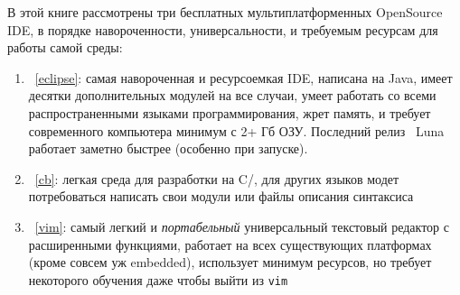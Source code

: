 В этой книге рассмотрены три бесплатных мультиплатформенных OpenSource IDE, в
порядке навороченности, универсальности, и требуемым ресурсам для работы самой
среды:

\begin{enumerate}
  \item \prog{\eclipse}\ \ref{eclipse}: самая навороченная и ресурсоемкая IDE,
  написана на Java, имеет десятки дополнительных модулей на все случаи, умеет работать со
  всеми распространенными языками программирования, жрет память, и требует
  современного компьютера минимум с 2+ Гб ОЗУ. Последний релиз \eclipse\ Luna
  работает заметно быстрее (особенно при запуске).
  \item \prog{\cb}\ \ref{cb}: легкая среда для разработки на
  C/\cpp, для других языков модет потребоваться написать свои модули или файлы описания синтаксиса
  \item \prog{\vim}\ \ref{vim}: самый легкий и \emph{портабельный} универсальный
  текстовый редактор с расширенными функциями, работает на всех
  существующих платформах (кроме совсем уж embedded), использует минимум
  ресурсов, но требует некоторого обучения даже чтобы выйти из \verb|vim|
  \smiley
\end{enumerate}





\secup
